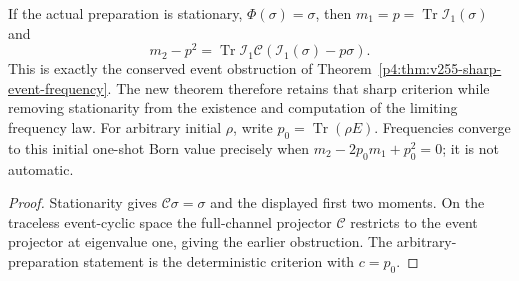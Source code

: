 \documentclass[12pt,a4paper]{article}
\begin{document}
\begin{corollary}
\label{p4:cor:v258-stationary-frequency-recovery}
If the actual preparation is stationary, $\Phi(\sigma)=\sigma$,
then $m_1=p=\operatorname{Tr}\mathcal I_1(\sigma)$ and
\[
 m_2-p^2
 =\operatorname{Tr}\mathcal I_1\mathcal C
              (\mathcal I_1(\sigma)-p\sigma).
\]
This is exactly the conserved event obstruction of
Theorem~\ref{p4:thm:v255-sharp-event-frequency}. The new theorem therefore
retains that sharp criterion while removing stationarity from the
existence and computation of the limiting frequency law.
For arbitrary initial $\rho$, write
$p_0=\operatorname{Tr}(\rho E)$. Frequencies converge to this initial
one-shot Born value precisely when
$m_2-2p_0m_1+p_0^2=0$; it is not automatic.
\end{corollary}
\begin{proof}
Stationarity gives $\mathcal C\sigma=\sigma$ and the displayed first
two moments. On the traceless event-cyclic space the full-channel
projector $\mathcal C$ restricts to the event projector at eigenvalue
one, giving the earlier obstruction. The arbitrary-preparation statement
is the deterministic criterion with $c=p_0$.
\end{proof}
\end{document}
